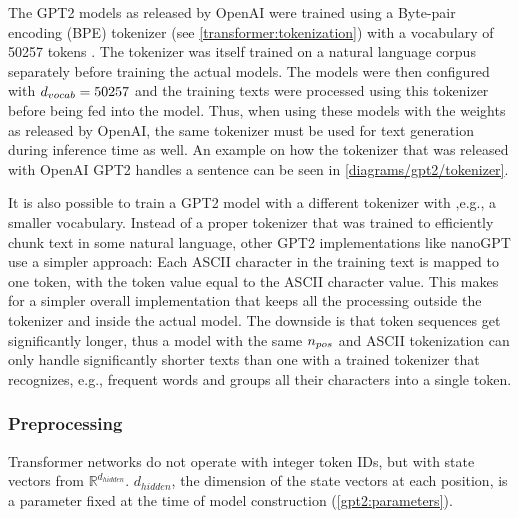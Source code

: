 \label{gpt2:tokenizer}

The GPT2 models as released by OpenAI were trained using a Byte-pair encoding (BPE) tokenizer (see \cref{transformer:tokenization}) with a vocabulary of 50257 tokens  \cite{HuggingFaceGPT2}. The tokenizer was itself trained on a natural language corpus separately before training the actual models. The models were then configured with ${d_{vocab}}=50257$ and the training texts were processed using this tokenizer before being fed into the model. Thus, when using these models with the weights as released by OpenAI, the same tokenizer must be used for text generation during inference time as well. An example on how the tokenizer that was released with OpenAI GPT2 handles a sentence can be seen in \cref{diagrams/gpt2/tokenizer}.

It is also possible to train a GPT2 model with a different tokenizer with ,e.g., a smaller vocabulary. Instead of a proper tokenizer that was trained to efficiently chunk text in some natural language, other GPT2 implementations like nanoGPT \cite{nanogpt} use a simpler approach: Each ASCII character in the training text is mapped to one token, with the token value equal to the ASCII character value.
This makes for a simpler overall implementation that keeps all the processing outside the tokenizer and inside the actual model.
The downside is that token sequences get significantly longer, thus a model with the same ${n_{pos}}$ and ASCII tokenization can only handle significantly shorter texts than one with a trained tokenizer that recognizes, e.g., frequent words and groups all their characters into a single token.



\subsubsection{Preprocessing}
\label{gpt2_preproc}


Transformer networks do not operate with integer token IDs, but with state vectors from $\mathbb{R}^{d_{hidden}}$. $d_{hidden}$, the dimension of the state vectors at each position, is a parameter fixed at the time of model construction (\cref{gpt2:parameters}).

